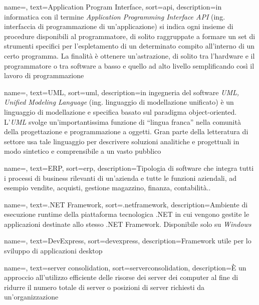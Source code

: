 
%

{
    name=,
    text=Application Program Interface,
    sort=api,
    description={in informatica con il termine \emph{Application Programming Interface API} (ing. interfaccia di programmazione di un'applicazione) si indica ogni insieme di procedure disponibili al programmatore, di solito raggruppate a formare un set di strumenti specifici per l'espletamento di un determinato compito all'interno di un certo programma. La finalità è ottenere un'astrazione, di solito tra l'hardware e il programmatore o tra software a basso e quello ad alto livello semplificando così il lavoro di programmazione}
}

{
    name=,
    text=UML,
    sort=uml,
    description={in ingegneria del software \emph{UML, Unified Modeling Language} (ing. linguaggio di modellazione unificato) è un linguaggio di modellazione e specifica basato sul paradigma object-oriented. L'\emph{UML} svolge un'importantissima funzione di ``lingua franca'' nella comunità della progettazione e programmazione a oggetti. Gran parte della letteratura di settore usa tale linguaggio per descrivere soluzioni analitiche e progettuali in modo sintetico e comprensibile a un vasto pubblico}
}

{
    name=,
    text=ERP,
    sort=erp,
    description={Tipologia di software che integra tutti i processi di business rilevanti di un'azienda e tutte le funzioni aziendali, ad esempio vendite, acquisti, gestione magazzino, finanza, contabilità..}
}

{
    name=,
    text=.NET Framework,
    sort=.netframework,
    description={Ambiente di esecuzione runtime della piattaforma tecnologica .NET in cui vengono gestite le applicazioni destinate allo stesso .NET Framework. Disponibile solo su \textit{Windows}}
}

{
    name=,
    text=DevExpress,
    sort=devexpress,
    description={Framework utile per lo sviluppo di applicazioni desktop}
}

{
    name=,
    text=server consolidation,
    sort=serverconsolidation,
    description={È un approccio all'utilizzo efficiente delle risorse dei server dei computer al fine di ridurre il numero totale di server o posizioni di server richiesti da un'organizzazione}
}


